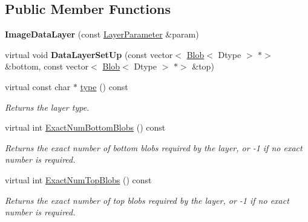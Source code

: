 \subsection*{Public Member Functions}
\begin{DoxyCompactItemize}
\item 
\mbox{\label{classcaffe_1_1_image_data_layer_a2319914181470f8ecd80ffb63d0daec9}} 
{\bfseries Image\+Data\+Layer} (const \mbox{\hyperlink{classcaffe_1_1_layer_parameter}{Layer\+Parameter}} \&param)
\item 
\mbox{\label{classcaffe_1_1_image_data_layer_a07b1e14f1c8222cb057cae5b2c303ef0}} 
virtual void {\bfseries Data\+Layer\+Set\+Up} (const vector$<$ \mbox{\hyperlink{classcaffe_1_1_blob}{Blob}}$<$ Dtype $>$ $\ast$$>$ \&bottom, const vector$<$ \mbox{\hyperlink{classcaffe_1_1_blob}{Blob}}$<$ Dtype $>$ $\ast$$>$ \&top)
\item 
\mbox{\label{classcaffe_1_1_image_data_layer_ac856b2705f2b8f46669d66c7cca2e9ed}} 
virtual const char $\ast$ \mbox{\hyperlink{classcaffe_1_1_image_data_layer_ac856b2705f2b8f46669d66c7cca2e9ed}{type}} () const
\begin{DoxyCompactList}\small\item\em Returns the layer type. \end{DoxyCompactList}\item 
virtual int \mbox{\hyperlink{classcaffe_1_1_image_data_layer_a6776c86faf14e35ae7be9848c7012aa5}{Exact\+Num\+Bottom\+Blobs}} () const
\begin{DoxyCompactList}\small\item\em Returns the exact number of bottom blobs required by the layer, or -\/1 if no exact number is required. \end{DoxyCompactList}\item 
virtual int \mbox{\hyperlink{classcaffe_1_1_image_data_layer_aa9182d46877b8514fca86e3588249567}{Exact\+Num\+Top\+Blobs}} () const
\begin{DoxyCompactList}\small\item\em Returns the exact number of top blobs required by the layer, or -\/1 if no exact number is required. \end{DoxyCompactList}\item 
\mbox{\label{classcaffe_1_1_image_data_layer_a2319914181470f8ecd80ffb63d0daec9}} 

\end{DoxyCompactItemize}

